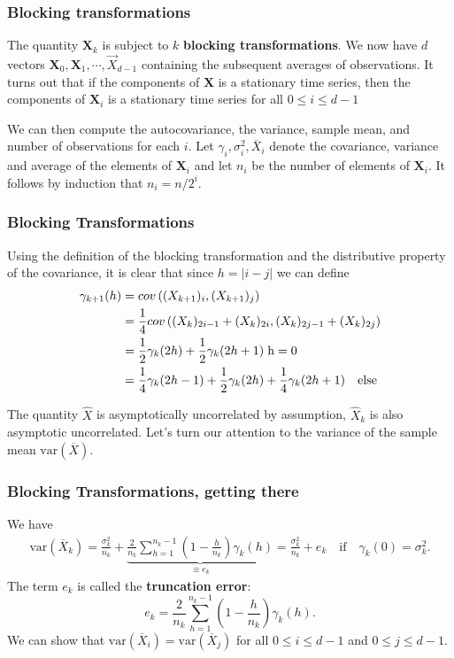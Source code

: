 \documentclass{beamer}
\begin{document}
\begin{frame}
\frametitle{Blocking transformations}

The quantity $\bm{X}_k$ is
subject to $k$ \textbf{blocking transformations}.  We now have $d$ vectors
$\bm{X}_0, \bm{X}_1,\cdots,\vec X_{d-1}$ containing the subsequent
averages of observations. It turns out that if the components of
$\bm{X}$ is a stationary time series, then the components of
$\bm{X}_i$ is a stationary time series for all $0 \leq i \leq d-1$

We can then compute the autocovariance, the variance, sample mean, and
number of observations for each $i$. 
Let $\gamma_i, \sigma_i^2,
\overline{X}_i$ denote the covariance, variance and average of the
elements of $\bm{X}_i$ and let $n_i$ be the number of elements of
$\bm{X}_i$. It follows by induction that $n_i = n/2^i$.
\end{frame}

\begin{frame}
\frametitle{Blocking Transformations}

Using the
definition of the blocking transformation and the distributive
property of the covariance, it is clear that since $h =|i-j|$
we can define
\begin{align}
\gamma_{k+1}(h) &= cov\left( ({X}_{k+1})_{i}, ({X}_{k+1})_{j} \right) \nonumber \\
&=  \frac{1}{4}cov\left( ({X}_{k})_{2i-1} + ({X}_{k})_{2i}, ({X}_{k})_{2j-1} + ({X}_{k})_{2j} \right) \nonumber \\
&=  \frac{1}{2}\gamma_{k}(2h) + \frac{1}{2}\gamma_k(2h+1) \hspace{0.1cm} \mathrm{h = 0} \\
&=\frac{1}{4}\gamma_k(2h-1) + \frac{1}{2}\gamma_k(2h) + \frac{1}{4}\gamma_k(2h+1) \quad \mathrm{else}
\end{align}

The quantity $\hat{X}$ is asymptotically uncorrelated by assumption, $\hat{X}_k$ is also asymptotic uncorrelated. Let's turn our attention to the variance of the sample
mean $\mathrm{var}(\overline{X})$.
\end{frame}

\begin{frame}
\frametitle{Blocking Transformations, getting there}

We have
\begin{align}
\mathrm{var}(\overline{X}_k) = \frac{\sigma_k^2}{n_k} + \underbrace{\frac{2}{n_k} \sum_{h=1}^{n_k-1}\left( 1 - \frac{h}{n_k} \right)\gamma_k(h)}_{\equiv e_k} = \frac{\sigma^2_k}{n_k} + e_k \quad \text{if} \quad \gamma_k(0) = \sigma_k^2. 
\end{align}
The term $e_k$ is called the \textbf{truncation error}: 
\begin{equation}
e_k = \frac{2}{n_k} \sum_{h=1}^{n_k-1}\left( 1 - \frac{h}{n_k} \right)\gamma_k(h). 
\end{equation}
We can show that $\mathrm{var}(\overline{X}_i) = \mathrm{var}(\overline{X}_j)$ for all $0 \leq i \leq d-1$ and $0 \leq j \leq d-1$.
\end{frame}
\end{document}
